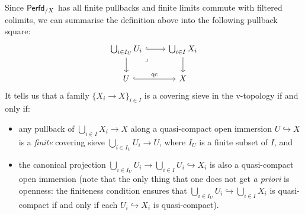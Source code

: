                 \begin{remark}
                    Since $\mathsf{Perfd}_{/X}$ has all finite pullbacks and finite limits commute with filtered colimits, we can summarise the definition above into the following pullback square:
                        $$
                            \begin{tikzcd}
                            	{\bigcup_{i \in I_U} U_i} & {\bigcup_{i \in I} X_i} \\
                            	U & X
                            	\arrow[from=1-2, to=2-2]
                            	\arrow[from=1-1, to=2-1]
                            	\arrow["\qc", hook, from=2-1, to=2-2]
                            	\arrow[hook, from=1-1, to=1-2]
                            	\arrow["\lrcorner"{anchor=center, pos=0.125}, draw=none, from=1-1, to=2-2]
                            \end{tikzcd}
                        $$
                    It tells us that a family $\{X_i \to X\}_{i \in I}$ is a covering sieve in the v-topology if and only if:
                        \begin{itemize}
                            \item any pullback of $\bigcup_{i \in I} X_i \to X$ along a quasi-compact open immersion $U \hookrightarrow X$ is a \textit{finite} covering sieve $\bigcup_{i \in I_U} U_i \to U$, where $I_U$ is a finite subset of $I$, and
                            \item the canonical projection $\bigcup_{i \in I_U} U_i \to \bigcup_{i \in I} U_i \hookrightarrow X_i$ is also a quasi-compact open immersion (note that the only thing that one does not get \textit{a priori} is openness: the finiteness condition ensures that $\bigcup_{i \in I_U} U_i \hookrightarrow \bigcup_{i \in I} X_i$ is quasi-compact if and only if each $U_i \hookrightarrow X_i$ is quasi-compact).
                        \end{itemize}
                \end{remark}
                
